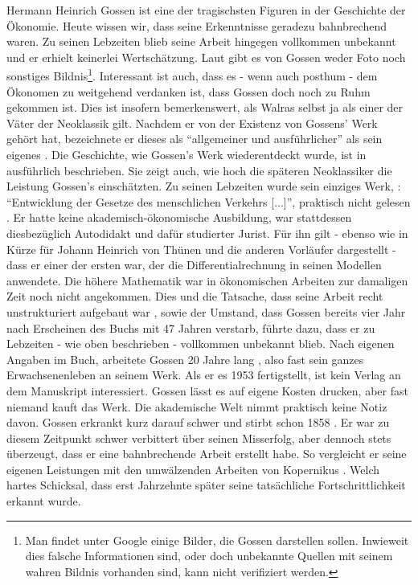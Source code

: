 Hermann Heinrich Gossen ist eine der tragischsten Figuren in der Geschichte der Ökonomie. Heute wissen wir, dass seine Erkenntnisse geradezu bahnbrechend waren. Zu seinen Lebzeiten blieb seine Arbeit hingegen vollkommen unbekannt und er erhielt keinerlei Wertschätzung. Laut \textcite{Kurz2009} gibt es von Gossen weder Foto noch sonstiges Bildnis\footnote{Man findet unter Google einige Bilder, die Gossen darstellen sollen. Inwieweit dies falsche Informationen sind, oder doch unbekannte Quellen mit seinem wahren Bildnis vorhanden sind, kann nicht verifiziert werden.}. Interessant ist auch, dass es - wenn auch posthum - dem Ökonomen \textcite{Walras1885} zu weitgehend verdanken ist, dass Gossen doch noch zu Ruhm gekommen ist. Dies ist insofern bemerkenswert, als Walras selbst ja als einer der Väter der Neoklassik gilt. Nachdem er von der Existenz von Gossens' Werk gehört hat, bezeichnete er dieses als "`allgemeiner und ausführlicher"' als sein eigenes \parencite[S. 1]{Kurz2009}. Die Geschichte, wie Gossen's Werk wiederentdeckt wurde, ist in \textcite{Ikeda2000} ausführlich beschrieben. Sie zeigt auch, wie hoch die späteren Neoklassiker die Leistung Gossen's einschätzten.
Zu seinen Lebzeiten wurde sein einziges Werk, \textcite{Gossen1854}: "`Entwicklung der Gesetze des menschlichen Verkehrs [...]"', praktisch nicht gelesen \parencite[S. 282]{Rosner2012}. Er hatte keine akademisch-ökonomische Ausbildung, war stattdessen diesbezüglich Autodidakt \parencite[S. 3]{Kurz2009} und dafür studierter Jurist. Für ihn gilt - ebenso wie in Kürze für Johann Heinrich von Thünen und die anderen Vorläufer dargestellt - dass er einer der ersten war, der die Differentialrechnung in seinen Modellen anwendete. Die höhere Mathematik war in ökonomischen Arbeiten zur damaligen Zeit noch nicht angekommen. Dies und die Tatsache, dass seine Arbeit \parencite{Gossen1854} recht unstrukturiert aufgebaut war \parencite[S. 20]{Kurz2009}, sowie der Umstand, dass Gossen bereits vier Jahr nach Erscheinen des Buchs mit 47 Jahren verstarb, führte dazu, dass er zu Lebzeiten - wie oben beschrieben - vollkommen unbekannt blieb. Nach eigenen Angaben im Buch, arbeitete Gossen 20 Jahre lang \parencite[S. 3]{Kurz2009}, also fast sein ganzes Erwachsenenleben an seinem Werk. Als er es 1953 fertigstellt, ist kein Verlag an dem Manuskript interessiert. Gossen lässt es auf eigene Kosten drucken, aber fast niemand kauft das Werk. Die akademische Welt nimmt praktisch keine Notiz davon. Gossen erkrankt kurz darauf schwer und stirbt schon 1858 \parencite[S.4]{Kurz2009}. Er war zu diesem Zeitpunkt schwer verbittert über seinen Misserfolg, aber dennoch stets überzeugt, dass er eine bahnbrechende Arbeit erstellt habe. So vergleicht er seine eigenen Leistungen mit den umwälzenden Arbeiten von Kopernikus \parencite{Kurz2009, Gossen1854}. Welch hartes Schicksal, dass erst Jahrzehnte später seine tatsächliche Fortschrittlichkeit erkannt wurde.

